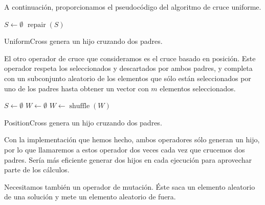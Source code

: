 \documentclass{article}
\begin{document}
A continuación, proporcionamos el pseudocódigo del algoritmo de cruce uniforme.

\begin{algorithm}[H]
	\DontPrintSemicolon %
	$S\gets\emptyset$\;
	$\operatorname{repair}(S)$ 
	\caption{{\sc UniformCross} genera un hijo cruzando dos padres.}
	\label{alg:uniform-cross}
\end{algorithm}

El otro operador de cruce que consideramos es el cruce basado en posición. Este operador respeta los seleccionados y descartados
por ambos padres, y completa con un subconjunto aleatorio de los elementos que sólo están seleccionados por uno de los padres hasta
obtener un vector con $m$ elementos seleccionados.

\begin{algorithm}[H]
	\DontPrintSemicolon %
	$S\gets\emptyset$\;
	$W\gets\emptyset$ 
	$W \gets \operatorname{shuffle}(W)$\;
	\caption{{\sc PositionCross} genera un hijo cruzando dos padres.}
	\label{alg:position-cross}
\end{algorithm}

Con la implementación que hemos hecho, ambos operadores sólo generan un hijo, por lo que llamaremos a estos operador dos veces cada vez que crucemos dos padres. Sería más eficiente generar dos hijos en cada ejecución para aprovechar parte de los cálculos.

Necesitamos también un operador de mutación. Éste saca un elemento aleatorio de una solución y mete un elemento aleatorio de fuera.
\end{document}
